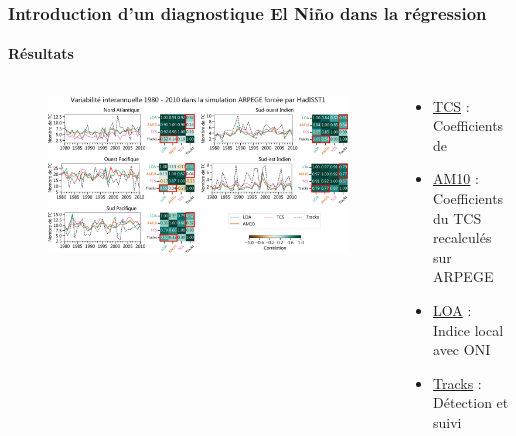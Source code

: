 \documentclass[aspectratio=169, usepdftitle=false, xcolor={dvipsnames}, 9pt,table]{beamer}
\begin{document}
\begin{frame}[t]
    \frametitle{Introduction d'un diagnostique El Niño dans la régression}
    \framesubtitle{Résultats}
    \vspace{-1em}
    \begin{columns}
        \begin{column}{0.8\textwidth}
            \begin{figure}
                \centering
                \includegraphics[width=\textwidth]{Figures/apport_ONI.png}
            \end{figure}
        \end{column}
        \begin{column}{0.2\textwidth}
            \scriptsize
            \begin{examples}
                \setlength{\leftmargini}{2.5ex}
                \begin{itemize}
                    \item \underline{TCS} :\\Coefficients de \cite{tippett_poisson_2011}
                    \item \underline{AM10} :\\Coefficients du TCS recalculés sur ARPEGE
                    \item \underline{LOA} :\\Indice \alert{local} avec ONI
                    \item \underline{Tracks} :\\Détection et suivi
                \end{itemize}
            \end{examples}
            \begin{block}
                \setlength{\leftmargini}{2.5ex}
                \begin{itemize}

\end{itemize}
\end{block}
\end{column}
\end{columns}
\end{frame}
\end{document}

